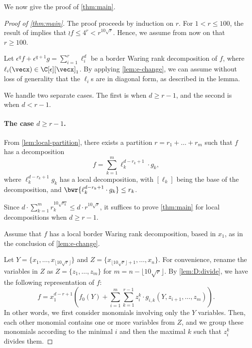 \documentclass{article}
\begin{document}
We now give the proof of \autoref{thm:main}. 
\begin{proof}[Proof of \autoref{thm:main}]

    The proof proceeds by induction on $r$. 
    For $1 < r \leq 100$, the result of \cite{DuttaGIJL24} implies that $\wr{f} \leq 4^r < r^{10\sqrt{r}}$. Hence, we assume from now on that $r \geq 100$.

    Let $\epsilon^q f + \epsilon^{q+1} g = \sum_{i=1}^{r} \ell_i^d$
    be a border Waring rank decomposition of $f$, where $\ell_i(\vecx) \in \C[\epsilon][\vecx]_1$. 
    By applying \autoref{lem:e-change}, we can assume without loss of generality that the $\ell_i$s are in diagonal form, as described in the lemma.  

    We handle two separate cases. The first is when $d \geq r-1$, and the second is when $d < r-1$. 

    \paragraph{The case $d \geq r-1$.} \sloppy
    From \autoref{lem:local-partition}, there exists a partition $r = r_1 + \ldots + r_m$ such that $f$ has a decomposition
    \[
    f = \sum_{k=1}^{m} \ell_k^{d-r_k+1} \cdot g_k,
    \]
    where $\ell_k^{d-r_k+1} g_k$ has a local decomposition, with $[\ell_k]$ being the base of the decomposition, and $\bwr{\ell_k^{d-r_k+1} \cdot g_k} \leq r_k$. 

    Since $d \cdot \sum_{k=1}^{m} r_k^{10\sqrt{r_k}} \leq d \cdot r^{10\sqrt{r}}$, it suffices to prove \autoref{thm:main} for local decompositions when $d \geq r-1$.

    Assume that $f$ has a local border Waring rank decomposition, based in $x_1$, as in the conclusion of \autoref{lem:e-change}.

    Let $Y = \{x_1, \ldots, x_{\lfloor 10\sqrt{r} \rfloor}\}$ and $Z = \{x_{\lfloor 10\sqrt{r} \rfloor+1}, \ldots, x_n\}$. For convenience, rename the variables in $Z$ as $Z = \{z_1, \ldots, z_m\}$ for $m = n - \lfloor 10\sqrt{r} \rfloor$. By \autoref{lem:D:divide}, we have the following representation of $f$: 
    \begin{equation}\label{eq:f-representation}
    f = x_1^{d-r+1} \left(f_0(Y) + \sum_{i=1}^{m} \sum_{k=1}^{r-1} z_i^k \cdot g_{i,k}(Y, z_{i+1}, \ldots, z_m)
    \right).    
    \end{equation}
    In other words, we first consider monomials involving only the $Y$ variables. Then, each other monomial contains one or more variables from $Z$, and we group these monomials according to the minimal $i$ and then the maximal $k$ such that $z_i^k$ divides them.


\end{proof}
\end{document}

